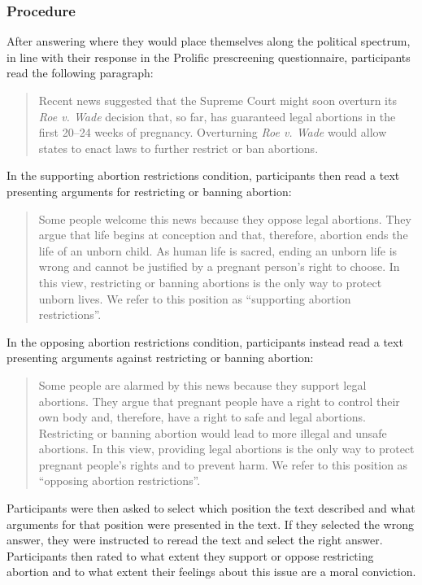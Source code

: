 \documentclass[12pt, letterpaper]{article}
\begin{document}
\hypertarget{procedure-2}{%
\subsubsection{Procedure}\label{procedure-2}}

After answering where they would place themselves along the political
spectrum, in line with their response in the Prolific prescreening
questionnaire, participants read the following paragraph:

\begin{quote}
Recent news suggested that the Supreme Court might soon overturn its
\emph{Roe v. Wade} decision that, so far, has guaranteed legal abortions
in the first 20--24 weeks of pregnancy. Overturning \emph{Roe v. Wade}
would allow states to enact laws to further restrict or ban abortions.
\end{quote}

\noindent In the supporting abortion restrictions condition,
participants then read a text presenting arguments for restricting or
banning abortion:

\begin{quote}
Some people welcome this news because they oppose legal abortions. They
argue that life begins at conception and that, therefore, abortion ends
the life of an unborn child. As human life is sacred, ending an unborn
life is wrong and cannot be justified by a pregnant person's right to
choose. In this view, restricting or banning abortions is the only way
to protect unborn lives. We refer to this position as ``supporting
abortion restrictions''.
\end{quote}

\noindent In the opposing abortion restrictions condition, participants
instead read a text presenting arguments against restricting or banning
abortion:

\begin{quote}
Some people are alarmed by this news because they support legal
abortions. They argue that pregnant people have a right to control their
own body and, therefore, have a right to safe and legal abortions.
Restricting or banning abortion would lead to more illegal and unsafe
abortions. In this view, providing legal abortions is the only way to
protect pregnant people's rights and to prevent harm. We refer to this
position as ``opposing abortion restrictions''.
\end{quote}

\noindent Participants were then asked to select which position the text
described and what arguments for that position were presented in the
text. If they selected the wrong answer, they were instructed to reread
the text and select the right answer. Participants then rated to what
extent they support or oppose restricting abortion and to what extent
their feelings about this issue are a moral conviction.
\end{document}
